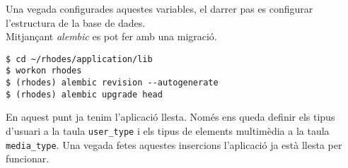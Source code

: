 Una vegada configurades aquestes variables, el darrer pas es configurar l'estructura de la base de dades.\\

Mitjançant \emph{alembic} es pot fer amb una migració.
\begin{verbatim}
$ cd ~/rhodes/application/lib
$ workon rhodes
$ (rhodes) alembic revision --autogenerate
$ (rhodes) alembic upgrade head
\end{verbatim}

En aquest punt ja tenim l'aplicació llesta. Només ens queda definir els tipus d'usuari a la taula \texttt{user\_type} i els tipus de elements multimèdia a la taula \texttt{media\_type}. Una vegada fetes aquestes insercions l'aplicació ja està llesta per funcionar.

